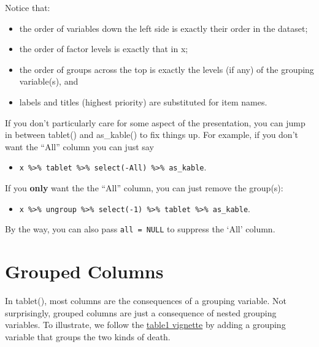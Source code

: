 \documentclass[
]{article}
\providecommand{\tightlist}{%
  \setlength{\itemsep}{0pt}\setlength{\parskip}{0pt}}
\begin{document}
Notice that:

\begin{itemize}
\tightlist
\item
  the order of variables down the left side is exactly their order in
  the dataset;
\item
  the order of factor levels is exactly that in x;
\item
  the order of groups across the top is exactly the levels (if any) of
  the grouping variable(s), and
\item
  labels and titles (highest priority) are substituted for item names.
\end{itemize}

If you don't particularly care for some aspect of the presentation, you
can jump in between tablet() and as\_kable() to fix things up. For
example, if you don't want the ``All'' column you can just say

\begin{itemize}
\tightlist
\item
  \texttt{x\ \%\textgreater{}\%\ tablet\ \%\textgreater{}\%\ select(-All)\ \%\textgreater{}\%\ as\_kable}.
\end{itemize}

If you \textbf{only} want the the ``All'' column, you can just remove
the group(s):

\begin{itemize}
\tightlist
\item
  \texttt{x\ \%\textgreater{}\%\ ungroup\ \%\textgreater{}\%\ select(-1)\ \%\textgreater{}\%\ tablet\ \%\textgreater{}\%\ as\_kable}.
\end{itemize}

By the way, you can also pass \texttt{all\ =\ NULL} to suppress the
`All' column.

\hypertarget{grouped-columns}{%
\section{Grouped Columns}\label{grouped-columns}}

In tablet(), most columns are the consequences of a grouping variable.
Not surprisingly, grouped columns are just a consequence of nested
grouping variables. To illustrate, we follow the
\href{https://CRAN.R-project.org/package=table1}{table1 vignette} by
adding a grouping variable that groups the two kinds of death.
\end{document}
